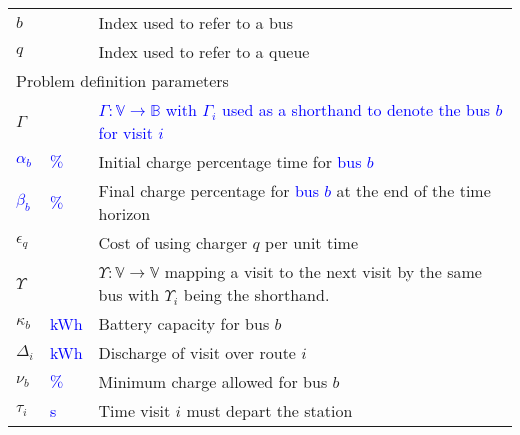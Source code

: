 \documentclass[utf8]{FrontiersinHarvard}
\begin{document}
\begin{table}[!htpb]
\begin{tabularx}{\textwidth}{l l l}
    $b$                      &                         & Index used to refer to a bus                                                                                      \\
    $q$                      &                         & Index used to refer to a queue                                                                                    \\
    \hline \multicolumn{3}{l}{Problem definition parameters}                                                                                                               \\
    \hline $\Gamma$               &                         & \textcolor{blue}{$\Gamma: \mathbb{V} \rightarrow \mathbb{B}$ with $\Gamma_i$ used as a shorthand to denote the bus $b$ for visit $i$} \\
    \textcolor{blue}{$\alpha_b$}  & \textcolor{blue}{$\%$}  & Initial charge percentage time for \textcolor{blue}{bus $b$}                                                      \\
    \textcolor{blue}{$\beta_b$}  & \textcolor{blue}{$\%$}  & Final charge percentage for \textcolor{blue}{bus $b$} at the end of the time horizon                              \\
    $\epsilon_q$                    &                         & Cost of using charger $q$ per unit time                                                                           \\
    $\Upsilon$                      &                         & $\Upsilon: \mathbb{V} \rightarrow \mathbb{V}$ mapping a visit to the
    next visit by the same bus with $\Upsilon_i$ being the shorthand.                                                                                                             \\
    $\kappa_b$                    & \textcolor{blue}{kWh}   & Battery capacity for bus $b$                                                                                      \\
    $\Delta_i$                    & \textcolor{blue}{kWh}   & Discharge of visit over route $i$                                                                                 \\
    $\nu_b$                    & \textcolor{blue}{$\%$}  & Minimum charge allowed for bus $b$                                                                                \\
    $\tau_i$                    & \textcolor{blue}{s}     & Time visit $i$ must depart the station                                                                            \\

\end{tabularx}
\end{table}
\end{document}
